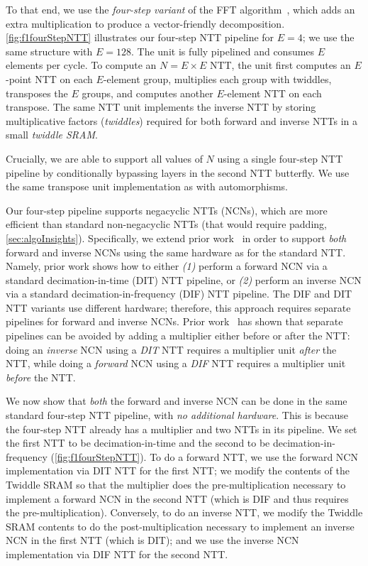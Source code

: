 \figFOneFourStepNTT

To that end, we use the \textit{four-step variant} of the FFT
algorithm~\cite{bailey:supercomputing89:FFTs}, which adds an extra
multiplication to produce a vector-friendly decomposition.
\autoref{fig:f1fourStepNTT} illustrates our four-step NTT pipeline for $E=4$;
we use the same structure with $E=128$. The unit is fully pipelined and
consumes $E$ elements per cycle. To compute an $N=E\times E$ NTT, the unit
first computes an $E$-point NTT on each $E$-element group, multiplies each
group with twiddles, transposes the $E$ groups, and computes another
$E$-element NTT on each transpose. The same NTT unit implements the inverse NTT
by storing multiplicative factors (\textit{twiddles}) required for both forward
and inverse NTTs in a small \textit{twiddle SRAM}.

Crucially, we are able to support all values of $N$ using a single four-step
NTT pipeline by conditionally bypassing layers in the second NTT butterfly. We
use the same transpose unit implementation as with automorphisms.

Our four-step pipeline supports negacyclic NTTs (NCNs), which are more
efficient than standard non-negacyclic NTTs (that would require padding,
\autoref{sec:algoInsights}). Specifically, we extend prior
work~\cite{poppelmann2015high,roy2014compact,lyubashevsky:tact10:ideal} in
order to support \emph{both} forward and inverse NCNs using the same hardware
as for the standard NTT. Namely, prior work shows how to either \emph{(1)}
perform a forward NCN via a standard decimation-in-time (DIT) NTT pipeline, or
\emph{(2)} perform an inverse NCN via a standard decimation-in-frequency (DIF)
NTT pipeline. The DIF and DIT NTT variants use different hardware; therefore,
this approach requires separate pipelines for forward and inverse NCNs. Prior
work~\cite{lyubashevsky:tact10:ideal} has shown that separate pipelines can be
avoided by adding a multiplier either before or after the NTT: doing an
\emph{inverse} NCN using a \emph{DIT} NTT requires a multiplier unit
\emph{after} the NTT, while doing a \emph{forward} NCN using a \emph{DIF} NTT
requires a multiplier unit \emph{before} the NTT.

We now show that \emph{both} the forward and inverse NCN can be done in the
same standard four-step NTT pipeline, with \emph{no additional hardware}. This
is because the four-step NTT already has a multiplier and two NTTs in its
pipeline. We set the first NTT to be decimation-in-time and the second to be
decimation-in-frequency (\autoref{fig:f1fourStepNTT}). To do a forward NTT, we
use the forward NCN implementation via DIT NTT for the first NTT; we modify the
contents of the Twiddle SRAM so that the multiplier does the pre-multiplication
necessary to implement a forward NCN in the second NTT (which is DIF and thus
requires the pre-multiplication). Conversely, to do an inverse NTT, we modify
the Twiddle SRAM contents to do the post\hyp{}mul\-ti\-pli\-ca\-tion necessary
to implement an inverse NCN in the first NTT (which is DIT); and we use the
inverse NCN imple\-men\-ta\-tion via DIF NTT for the second NTT.

